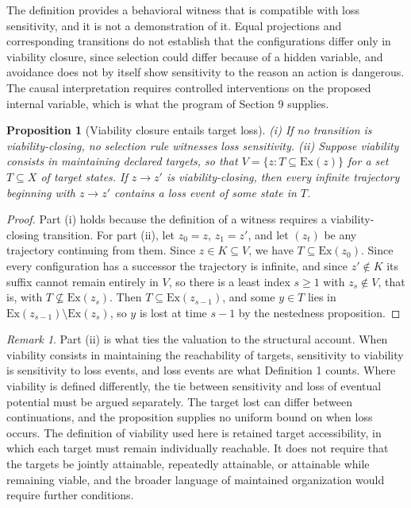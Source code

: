 \documentclass[11pt]{article}
\theoremstyle{definition}
\theoremstyle{plain}
\newtheorem{proposition}{Proposition}
\theoremstyle{remark}
\newtheorem*{remark}{Remark}
\begin{document}
The definition provides a behavioral witness that is compatible with loss sensitivity, and it is not a demonstration of it. Equal projections and corresponding transitions do not establish that the configurations differ only in viability closure, since selection could differ because of a hidden variable, and avoidance does not by itself show sensitivity to the reason an action is dangerous. The causal interpretation requires controlled interventions on the proposed internal variable, which is what the program of Section 9 supplies.

\begin{proposition}[Viability closure entails target loss]
(i) If no transition is viability-closing, no selection rule witnesses loss sensitivity. (ii) Suppose viability consists in maintaining declared targets, so that $V = \{z : T \subseteq \mathrm{Ex}(z)\}$ for a set $T \subseteq X$ of target states. If $z \to z'$ is viability-closing, then every infinite trajectory beginning with $z \to z'$ contains a loss event of some state in $T$.
\end{proposition}

\begin{proof}
Part (i) holds because the definition of a witness requires a viability-closing transition. For part (ii), let $z_0 = z$, $z_1 = z'$, and let $(z_t)$ be any trajectory continuing from them. Since $z \in K \subseteq V$, we have $T \subseteq \mathrm{Ex}(z_0)$. Since every configuration has a successor the trajectory is infinite, and since $z' \notin K$ its suffix cannot remain entirely in $V$, so there is a least index $s \ge 1$ with $z_s \notin V$, that is, with $T \not\subseteq \mathrm{Ex}(z_s)$. Then $T \subseteq \mathrm{Ex}(z_{s-1})$, and some $y \in T$ lies in $\mathrm{Ex}(z_{s-1}) \setminus \mathrm{Ex}(z_s)$, so $y$ is lost at time $s - 1$ by the nestedness proposition.
\end{proof}

\begin{remark}
Part (ii) is what ties the valuation to the structural account. When viability consists in maintaining the reachability of targets, sensitivity to viability is sensitivity to loss events, and loss events are what Definition 1 counts. Where viability is defined differently, the tie between sensitivity and loss of eventual potential must be argued separately. The target lost can differ between continuations, and the proposition supplies no uniform bound on when loss occurs. The definition of viability used here is retained target accessibility, in which each target must remain individually reachable. It does not require that the targets be jointly attainable, repeatedly attainable, or attainable while remaining viable, and the broader language of maintained organization would require further conditions.
\end{remark}
\end{document}
